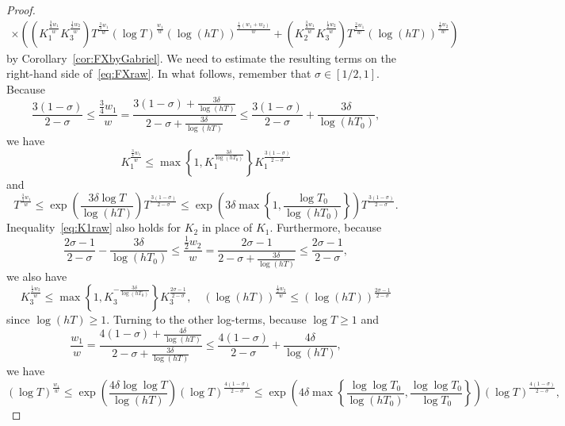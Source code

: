 \documentclass[a4paper,reqno]{amsart}
\theoremstyle{definition}
\begin{document}
\begin{proof}
\begin{multline}
\times\left(\left(K_1^{\frac{\frac{3}{4}w_1}{w}}K_3^{\frac{\frac{1}{2}w_2}{w}}\right)T^{\frac{\frac{3}{4}w_1}{w}}\left(\log{T}\right)^{\frac{w_1}{w}}\left(\log{(hT)}\right)^{\frac{\frac{1}{2}\left(w_1+w_2\right)}{w}} + \left(K_2^{\frac{\frac{3}{4}w_1}{w}}K_3^{\frac{\frac{1}{2}w_2}{w}}\right)T^{\frac{\frac{3}{4}w_1}{w}}\left(\log{(hT)}\right)^{\frac{\frac{1}{2}w_2}{w}}\right)
\end{multline}
by Corollary~\ref{cor:FXbyGabriel}. We need to estimate the resulting terms on the right-hand side of~\eqref{eq:FXraw}. In what follows, remember that $\sigma\in[1/2,1]$. Because
\[
\frac{3(1-\sigma)}{2-\sigma}\leq \frac{\frac{3}{4}w_1}{w} = \frac{3(1-\sigma)+\frac{3\delta}{\log{(hT)}}}{2-\sigma+\frac{3\delta}{\log{(hT)}}} \leq \frac{3(1-\sigma)}{2-\sigma} + \frac{3\delta}{\log{(hT_0)}}, 
\]
we have
\begin{equation}
\label{eq:K1raw}
K_1^{\frac{\frac{3}{4}w_1}{w}} \leq \max\left\{1,K_1^{\frac{3\delta}{\log{(hT_0)}}}\right\}K_1^{\frac{3(1-\sigma)}{2-\sigma}}
\end{equation}
and
\begin{equation}
\label{eq:Traw}
T^{\frac{\frac{3}{4}w_1}{w}} \leq \exp{\left(\frac{3\delta\log{T}}{\log{(hT)}}\right)}T^{\frac{3(1-\sigma)}{2-\sigma}} \leq \exp{\left(3\delta\max\left\{1,\frac{\log{T_0}}{\log{(hT_0)}}\right\}\right)}T^{\frac{3(1-\sigma)}{2-\sigma}}.
\end{equation}
Inequality~\eqref{eq:K1raw} also holds for $K_2$ in place of $K_1$. Furthermore, because
\[
\frac{2\sigma-1}{2-\sigma} - \frac{3\delta}{\log{(hT_0)}}\leq \frac{\frac{1}{2}w_2}{w} = \frac{2\sigma-1}{2-\sigma+\frac{3\delta}{\log{(hT)}}} \leq \frac{2\sigma-1}{2-\sigma},
\]
we also have
\begin{equation}
\label{eq:K3raw}
K_3^{\frac{\frac{1}{2}w_2}{w}} \leq \max\left\{1,K_3^{-\frac{3\delta}{\log{(hT_0)}}}\right\}K_3^{\frac{2\sigma-1}{2-\sigma}}, \quad \left(\log{(hT)}\right)^{\frac{\frac{1}{2}w_2}{w}} \leq \left(\log{(hT)}\right)^{\frac{2\sigma-1}{2-\sigma}}
\end{equation}
since $\log{(hT)}\geq 1$. Turning to the other log-terms, because $\log{T}\geq 1$ and
\[
\frac{w_1}{w} = \frac{4(1-\sigma)+\frac{4\delta}{\log{(hT)}}}{2-\sigma+\frac{3\delta}{\log{(hT)}}} \leq \frac{4(1-\sigma)}{2-\sigma}+\frac{4\delta}{\log{(hT)}},
\]
we have
\begin{equation}
\label{eq:logTraw}
\left(\log{T}\right)^{\frac{w_1}{w}} \leq \exp{\left(\frac{4\delta\log{\log{T}}}{\log{(hT)}}\right)}\left(\log{T}\right)^{\frac{4(1-\sigma)}{2-\sigma}} \leq \exp{\left(4\delta\max\left\{\frac{\log{\log{T_0}}}{\log{(hT_0)}},\frac{\log{\log{T_0}}}{\log{T_0}}\right\}\right)}\left(\log{T}\right)^{\frac{4(1-\sigma)}{2-\sigma}},

\end{equation}
\end{proof}
\end{document}
